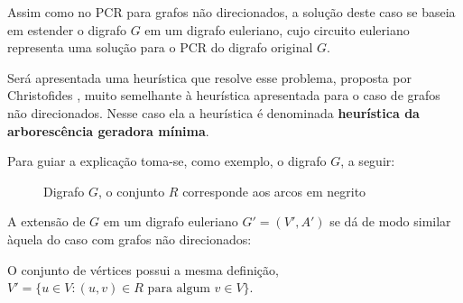         Assim como no PCR para grafos não direcionados, a solução deste caso se baseia em estender o digrafo $G$ em um digrafo euleriano, cujo circuito euleriano representa uma solução para o PCR do digrafo original $G$.

        Será apresentada uma heurística que resolve esse problema, proposta por Christofides \cite{christofides-86}, muito semelhante à heurística apresentada para o caso de grafos não direcionados.
        Nesse caso ela a heurística é denominada \textbf{heurística da arborescência geradora mínima}.

        Para guiar a explicação toma-se, como exemplo, o digrafo $G$, a seguir:
   

        \begin{figure}[H]
            \centering
            \caption{Digrafo $G$, o conjunto $R$ corresponde aos arcos em negrito}
            \label{pcr-digraph}
        \end{figure}

        A extensão de $G$ em um digrafo euleriano $G' = (V', A')$ se dá de modo similar àquela do caso com grafos não direcionados:

        O conjunto de vértices possui a mesma definição, $V' = \{u \in V : (u, v) \in R \text{ para algum } v \in V\}$. 

